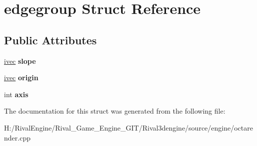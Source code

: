 \hypertarget{structedgegroup}{}\section{edgegroup Struct Reference}
\label{structedgegroup}
\subsection*{Public Attributes}
\begin{DoxyCompactItemize}
\item 
\mbox{\label{structedgegroup_ab10c667196232f99e71f6fdc864bf519}} 
\hyperlink{structivec}{ivec} {\bfseries slope}
\item 
\mbox{\label{structedgegroup_a68564d72dcf2555be453ed4de1d43cc0}} 
\hyperlink{structivec}{ivec} {\bfseries origin}
\item 
\mbox{\label{structedgegroup_ab864d927422ec195e2a4fa04e932231b}} 
int {\bfseries axis}
\end{DoxyCompactItemize}


The documentation for this struct was generated from the following file\+:\begin{DoxyCompactItemize}
\item 
H\+:/\+Rival\+Engine/\+Rival\+\_\+\+Game\+\_\+\+Engine\+\_\+\+G\+I\+T/\+Rival3dengine/source/engine/octarender.\+cpp\end{DoxyCompactItemize}
